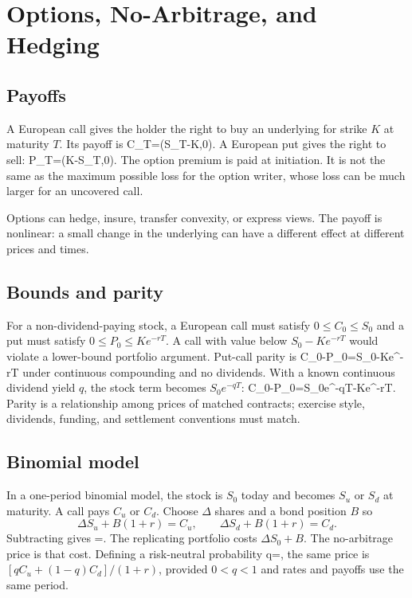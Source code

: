 \chapter{Options, No-Arbitrage, and Hedging}

\section{Payoffs}
A European call gives the holder the right to buy an underlying for strike $K$ at maturity $T$. Its payoff is
  C_T=\max(S_T-K,0).
\closeformula
A European put gives the right to sell:
  P_T=\max(K-S_T,0).
\closeformula
The option premium is paid at initiation. It is not the same as the maximum possible loss for the option writer, whose loss can be much larger for an uncovered call.

Options can hedge, insure, transfer convexity, or express views. The payoff is nonlinear: a small change in the underlying can have a different effect at different prices and times.

\section{Bounds and parity}
For a non-dividend-paying stock, a European call must satisfy $0\leq C_0\leq S_0$ and a put must satisfy $0\leq P_0\leq Ke^{-rT}$. A call with value below $S_0-Ke^{-rT}$ would violate a lower-bound portfolio argument. Put-call parity is
  C_0-P_0=S_0-Ke^{-rT}
\closeformula
under continuous compounding and no dividends. With a known continuous dividend yield $q$, the stock term becomes $S_0e^{-qT}$:
  C_0-P_0=S_0e^{-qT}-Ke^{-rT}.
\closeformula
Parity is a relationship among prices of matched contracts; exercise style, dividends, funding, and settlement conventions must match.

\section{Binomial model}
In a one-period binomial model, the stock is $S_0$ today and becomes $S_u$ or $S_d$ at maturity. A call pays $C_u$ or $C_d$. Choose $\Delta$ shares and a bond position $B$ so
\[\Delta S_u+B(1+r)=C_u,\qquad \Delta S_d+B(1+r)=C_d.\]
Subtracting gives
  \Delta=.
\closeformula
The replicating portfolio costs $\Delta S_0+B$. The no-arbitrage price is that cost. Defining a risk-neutral probability
  q=,
\closeformula
the same price is $[qC_u+(1-q)C_d]/(1+r)$, provided $0<q<1$ and rates and payoffs use the same period.

